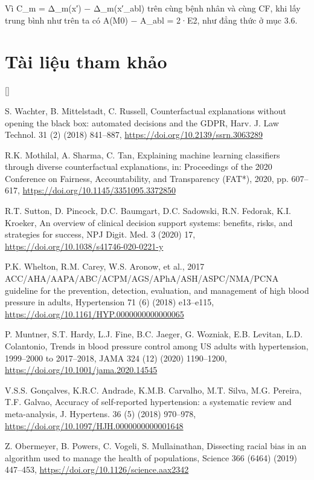 \documentclass[9pt,a4paper]{extarticle}
\newcounter{refc}
\begin{document}
Vì C\_m = Δ\_m(x′) − Δ\_m(x′\_abl) trên cùng bệnh nhân và cùng CF, khi
lấy trung bình như trên ta có A(M0) − A\_abl = 2·E2, như đẳng thức ở mục
3.6.

\section{Tài liệu tham khảo}
{\scriptsize\raggedright\sloppy
\begin{list}{[]}{\setlength{\leftmargin}{2.2em}\setlength{\labelwidth}{2em}\setlength{\itemsep}{0.5pt}\setlength{\parsep}{0pt}}
\item S. Wachter, B. Mittelstadt, C. Russell, Counterfactual explanations without opening the black box: automated decisions and the GDPR, Harv. J. Law Technol. 31 (2) (2018) 841–887, \url{https://doi.org/10.2139/ssrn.3063289}
\item R.K. Mothilal, A. Sharma, C. Tan, Explaining machine learning classifiers through diverse counterfactual explanations, in: Proceedings of the 2020 Conference on Fairness, Accountability, and Transparency (FAT*), 2020, pp. 607–617, \url{https://doi.org/10.1145/3351095.3372850}
\item R.T. Sutton, D. Pincock, D.C. Baumgart, D.C. Sadowski, R.N. Fedorak, K.I. Kroeker, An overview of clinical decision support systems: benefits, risks, and strategies for success, NPJ Digit. Med. 3 (2020) 17, \url{https://doi.org/10.1038/s41746-020-0221-y}
\item P.K. Whelton, R.M. Carey, W.S. Aronow, et al., 2017 ACC/AHA/AAPA/ABC/ACPM/AGS/APhA/ASH/ASPC/NMA/PCNA guideline for the prevention, detection, evaluation, and management of high blood pressure in adults, Hypertension 71 (6) (2018) e13–e115, \url{https://doi.org/10.1161/HYP.0000000000000065}
\item P. Muntner, S.T. Hardy, L.J. Fine, B.C. Jaeger, G. Wozniak, E.B. Levitan, L.D. Colantonio, Trends in blood pressure control among US adults with hypertension, 1999–2000 to 2017–2018, JAMA 324 (12) (2020) 1190–1200, \url{https://doi.org/10.1001/jama.2020.14545}
\item V.S.S. Gonçalves, K.R.C. Andrade, K.M.B. Carvalho, M.T. Silva, M.G. Pereira, T.F. Galvao, Accuracy of self-reported hypertension: a systematic review and meta-analysis, J. Hypertens. 36 (5) (2018) 970–978, \url{https://doi.org/10.1097/HJH.0000000000001648}
\item Z. Obermeyer, B. Powers, C. Vogeli, S. Mullainathan, Dissecting racial bias in an algorithm used to manage the health of populations, Science 366 (6464) (2019) 447–453, \url{https://doi.org/10.1126/science.aax2342}

\end{list}}
\end{document}
